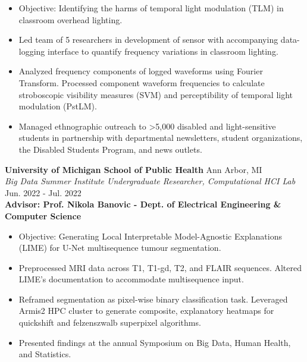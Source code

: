 \documentclass[a4paper]{article}
\begin{document}
\begin{itemize} \itemsep 1pt
	\setlength\itemsep{0pt}  %
	\setlength\parskip{0pt}  %
	\setlength\parsep{0pt}  %
	\setlength\leftskip{0pt}  %
	\renewcommand\labelitemi{\tiny$\bullet$} %
        \item Objective: Identifying the harms of temporal light modulation (TLM) in classroom overhead lighting. 
        \item Led team of 5 researchers in development of sensor with accompanying data-logging interface to quantify frequency variations in classroom lighting.
        \item Analyzed frequency components of logged waveforms using Fourier Transform. Processed component waveform frequencies to calculate stroboscopic visibility measures (SVM) and perceptibility of temporal light modulation (PstLM).
        \item Managed ethnographic outreach to >5,000 disabled and light-sensitive students in partnership with departmental newsletters, student organizations, the Disabled Students Program, and news outlets.

\end{itemize}
\textbf{University of Michigan School of Public Health} \hfill Ann Arbor, MI\\
\textit{Big Data Summer Institute Undergraduate Researcher, Computational HCI Lab} \hfill Jun. 2022 - Jul. 2022\\
\vspace{2mm}
\setlength\leftskip{25pt}
\textbf{Advisor: Prof. Nikola Banovic - Dept. of Electrical Engineering \& Computer Science} \\
\setlength\leftskip{0pt}
\vspace{-2mm}
\begin{itemize}
	\setlength\itemsep{0pt}  %
	\setlength\parskip{0pt}  %
	\setlength\parsep{0pt}  %
	\setlength\leftskip{0pt}  %
	\renewcommand\labelitemi{\tiny$\bullet$} %
    \item Objective: Generating Local Interpretable Model-Agnostic Explanations (LIME) for U-Net multisequence tumour segmentation.
    \item Preprocessed MRI data across T1, T1-gd, T2, and FLAIR sequences. Altered LIME's documentation to accommodate multisequence input.
    \item Reframed segmentation as pixel-wise binary classification task. Leveraged Armis2 HPC cluster to generate composite, explanatory heatmaps for quickshift and felzenszwalb superpixel algorithms.  
    \item Presented findings at the annual Symposium on Big Data, Human Health, and Statistics.

\end{itemize}
\end{document}
